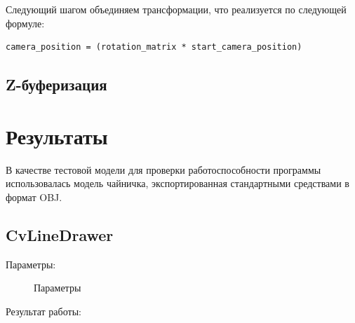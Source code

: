 \documentclass[14pt,a4paper,report]{report}
\begin{document}
Следующий шагом  объединяем трансформации, что реализуется по следующей формуле:
\begin{lstlisting}
camera_position = (rotation_matrix * start_camera_position)
\end{lstlisting}


\subsection{Z-буферизация}







\clearpage
\section{Результаты}
В качестве тестовой модели для проверки работоспособности программы использовалась модель чайничка, экспортированная стандартными средствами в формат OBJ.

 


\subsection{CvLineDrawer}
Параметры:

\begin{figure}[h!]
\caption{Параметры}
\label{ris:image}
\end{figure}

Результат работы: 
\end{document}
